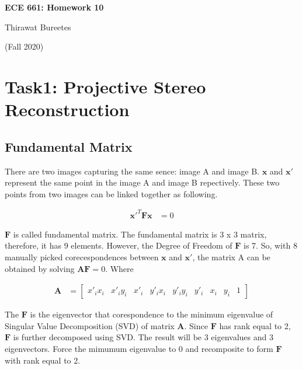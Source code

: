 \documentclass[11pt]{article}
\begin{document}
\begin{center}
\Large{\textbf{ECE 661: Homework 10}}

Thirawat Bureetes

(Fall 2020)
\end{center}
	
 

\section*{Task1: Projective Stereo Reconstruction}


\subsection*{Fundamental Matrix}

There are two images capturing the same sence: image A and image B. $\mathbf{x}$ and $\mathbf{x}'$ represent the same point in the image A and image B repectively. These two points from two images can be linked together as following.

\begin{align*}
\mathbf{x'}^T\mathbf{F}\mathbf{x} &= 0
\end{align*}

$\mathbf{F}$ is called fundamental matrix. The fundamental matrix is 3 x 3 matrix, therefore, it has 9 elements. However, the Degree of Freedom of $\mathbf{F}$ is 7. So, with 8 manually picked corecespondences between $\mathbf{x}$ and $\mathbf{x}'$, the matrix A can be obtained by solving $\mathbf{A}\mathbf{F} = 0$. Where 

\begin{align*}
\mathbf{A}&= 
\begin{bmatrix} 
x'_ix_i & x'_iy_i & x'_i & y'_ix_i & y'_iy_i & y'_i & x_i & y_i & 1
\end{bmatrix}
\end{align*}

The $\mathbf{F}$ is the eigenvector that corespondence to the minimum eigenvalue of Singular Value Decomposition (SVD) of matrix $\mathbf{A}$. Since $\mathbf{F}$ has rank equal to 2, $\mathbf{F}$ is further decomposed using SVD. The result will be 3 eigenvalues and 3 eigenvectors. Force the mimumum eigenvalue to 0 and recomposite to form $\mathbf{F}$ with rank equal to 2.
 

\end{document}
